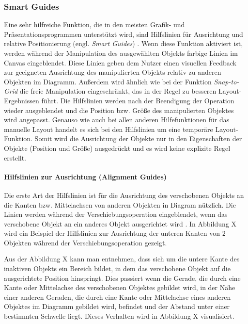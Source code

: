 
\subsubsection{Smart Guides}
\label{subsubsec:smart-guides}

Eine sehr hilfreiche Funktion, die in den meisten Grafik- und Präsentationsprogrammen unterstützt wird, sind Hilfslinien für Ausrichtung und relative Positionierung (engl. \textit{Smart Guides}) \cite{11Keynote}. Wenn diese Funktion aktiviert ist, werden während der Manipulation des ausgewählten Objekts farbige Linien im Canvas eingeblendet. Diese Linien geben dem Nutzer einen visuellen Feedback zur geeigneten Ausrichtung des manipulierten Objekts relativ zu anderen Objekten im Diagramm. Außerdem wird ähnlich wie bei der Funktion \textit{Snap-to-Grid} die freie Manipulation eingeschränkt, das in der Regel zu besseren Layout-Ergebnissen führt. Die Hilfslinien werden nach der Beendigung der Operation wieder ausgeblendet und die Position bzw. Größe des manipulierten Objektes wird angepasst. Genauso wie auch bei allen anderen Hilfefunktionen für das manuelle Layout handelt es sich bei den Hilfslinien um eine temporäre Layout-Funktion. Somit wird die Ausrichtung der Objekte nur in den Eigenschaften der Objekte (Position und Größe) ausgedrückt und es wird keine explizite Regel erstellt.

\paragraph{Hilfslinien zur Ausrichtung (Alignment Guides)}

Die erste Art der Hilfslinien ist für die Ausrichtung des verschobenen Objekts an die Kanten bzw. Mittelachsen von anderen Objekten in Diagram nützlich. Die Linien werden während der Verschiebungsoperation eingeblendet, wenn das verschobene Objekt an ein anderes Objekt ausgerichtet wird \cite{11Keynote}. In Abbildung X wird ein Beispiel der Hilfslinien zur Ausrichtung der unteren Kanten von 2 Objekten während der Verschiebungsoperation gezeigt.


Aus der Abbildung X kann man entnehmen, dass sich um die untere Kante des inaktiven Objekts ein Bereich bildet, in dem das verschobene Objekt auf die ausgerichtete Position hinspringt. Dies passiert wenn die Gerade, die durch eine Kante oder Mittelachse des verschobenen Objektes gebildet wird, in der Nähe einer anderen Geraden, die durch eine Kante oder Mittelachse eines anderen Objektes im Diagramm gebildet wird, befindet und der Abstand unter einer bestimmten Schwelle liegt. Dieses Verhalten wird in Abbildung X visualisiert.

